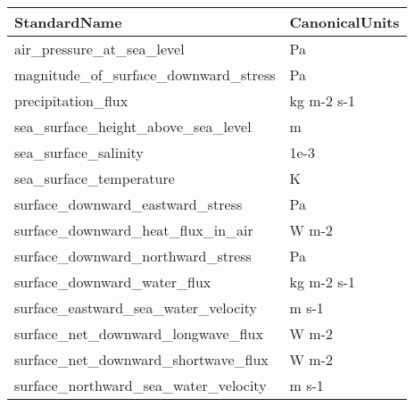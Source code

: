 \vspace{4ex}
\begin{tabular}{|l|l|}
\hline \hline
   {\bf StandardName}
 & {\bf CanonicalUnits}
\\ \hline \hline


                             air\_pressure\_at\_sea\_level
 &                                                Pa
\\ \hline
                  magnitude\_of\_surface\_downward\_stress
 &                                                Pa
\\ \hline
                                    precipitation\_flux
 &                                        kg m-2 s-1
\\ \hline
                    sea\_surface\_height\_above\_sea\_level
 &                                                 m
\\ \hline
                                  sea\_surface\_salinity
 &                                              1e-3
\\ \hline
                               sea\_surface\_temperature
 &                                                 K
\\ \hline
                      surface\_downward\_eastward\_stress
 &                                                Pa
\\ \hline
                     surface\_downward\_heat\_flux\_in\_air
 &                                             W m-2
\\ \hline
                     surface\_downward\_northward\_stress
 &                                                Pa
\\ \hline
                           surface\_downward\_water\_flux
 &                                        kg m-2 s-1
\\ \hline
                   surface\_eastward\_sea\_water\_velocity
 &                                             m s-1
\\ \hline
                    surface\_net\_downward\_longwave\_flux
 &                                             W m-2
\\ \hline
                   surface\_net\_downward\_shortwave\_flux
 &                                             W m-2
\\ \hline
                  surface\_northward\_sea\_water\_velocity
 &                                             m s-1
\\ \hline
\hline
\end{tabular}

